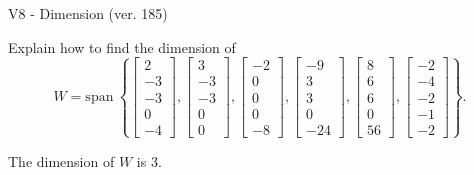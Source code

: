 \begin{exercise}
  \begin{exerciseTitle}V8 - Dimension (ver. 185)\end{exerciseTitle}
  \begin{exerciseStatement}
    Explain how to find the dimension of 
\[W=\mathrm{span}\ \left\{\left[\begin{array}{r}
2 \\
-3 \\
-3 \\
0 \\
-4
\end{array}\right] , \left[\begin{array}{r}
3 \\
-3 \\
-3 \\
0 \\
0
\end{array}\right] , \left[\begin{array}{r}
-2 \\
0 \\
0 \\
0 \\
-8
\end{array}\right] , \left[\begin{array}{r}
-9 \\
3 \\
3 \\
0 \\
-24
\end{array}\right] , \left[\begin{array}{r}
8 \\
6 \\
6 \\
0 \\
56
\end{array}\right] , \left[\begin{array}{r}
-2 \\
-4 \\
-2 \\
-1 \\
-2
\end{array}\right]\right\}.\]



  \end{exerciseStatement}
  \begin{exerciseAnswer}
   The dimension of \(W\) is  \(3\).
  


  \end{exerciseAnswer}
\end{exercise}